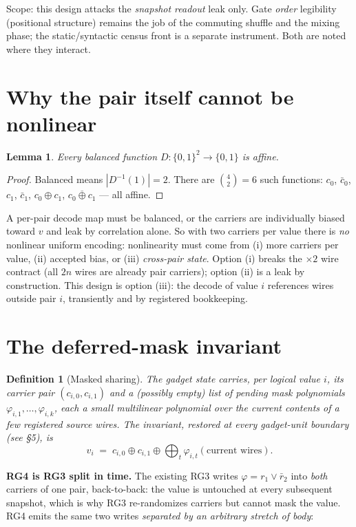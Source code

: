\documentclass[11pt]{article}
\newtheorem{lemma}{Lemma}
\newtheorem{definition}{Definition}
\begin{document}
Scope: this design attacks the \emph{snapshot readout} leak only. Gate
\emph{order} legibility (positional structure) remains the job of the
commuting shuffle and the mixing phase; the static/syntactic census front
is a separate instrument. Both are noted where they interact.

\section{Why the pair itself cannot be nonlinear}

\begin{lemma}
Every balanced function $D : \{0,1\}^2 \to \{0,1\}$ is affine.
\end{lemma}
\begin{proof}
Balanced means $|D^{-1}(1)| = 2$. There are $\binom{4}{2} = 6$ such
functions: $c_0$, $\bar c_0$, $c_1$, $\bar c_1$, $c_0 \oplus c_1$,
$\overline{c_0 \oplus c_1}$ --- all affine.
\end{proof}

A per-pair decode map must be balanced, or the carriers are individually
biased toward $v$ and leak by correlation alone. So with two carriers per
value there is \emph{no} nonlinear uniform encoding: nonlinearity must
come from (i) more carriers per value, (ii) accepted bias, or (iii)
\emph{cross-pair state}. Option (i) breaks the $\times 2$ wire contract
(all $2n$ wires are already pair carriers); option (ii) is a leak by
construction. This design is option (iii): the decode of value $i$
references wires outside pair $i$, transiently and by registered
bookkeeping.

\section{The deferred-mask invariant}

\begin{definition}[Masked sharing]
The gadget state carries, per logical value $i$, its carrier pair
$(c_{i,0}, c_{i,1})$ \emph{and} a (possibly empty) list of pending mask
polynomials $\varphi_{i,1}, \dots, \varphi_{i,k}$, each a small
multilinear polynomial over the \emph{current} contents of a few
registered source wires. The invariant, restored at every gadget-unit
boundary (see \S5), is
\[
v_i \;=\; c_{i,0} \oplus c_{i,1} \oplus \bigoplus_t \varphi_{i,t}
(\text{current wires}).
\]
\end{definition}

\textbf{RG4 is RG3 split in time.} The existing RG3 writes
$\varphi = r_1 \vee \bar r_2$ into \emph{both} carriers of one pair,
back-to-back: the value is untouched at every subsequent snapshot, which
is why RG3 re-randomizes carriers but cannot mask the value. RG4 emits the
same two writes \emph{separated by an arbitrary stretch of body}:
\end{document}
